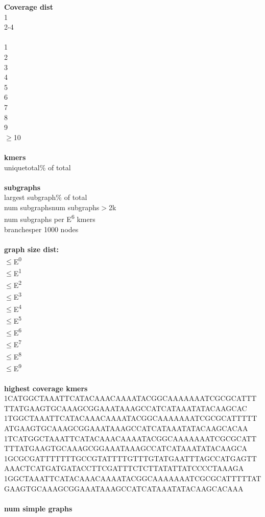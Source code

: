 \documentclass[a4paper, 12pt, oneside]{article}
\begin{document}
\textbf{Coverage dist}\\
1\\
2-4\\
\\
1\\
2\\
3\\
4\\
5\\
6\\
7\\
8\\
9\\
\(\geq\)10   \\
\\
\textbf{kmers}\\
unique\quad\quad total\quad\quad \% of total\\
\\
\textbf{subgraphs}\\
largest subgraph\quad\quad  \% of total\\
num subgraphs\quad num subgraphs\(>\)2k\\
num subgraphs per E\textsuperscript{6} kmers\\
branches\quad\quad per 1000 nodes\\
\\
\textbf{graph size dist:}\\
\(\leq\)E\textsuperscript{0}\\
\(\leq\)E\textsuperscript{1}\\
\(\leq\)E\textsuperscript{2}\\
\(\leq\)E\textsuperscript{3}\\
\(\leq\)E\textsuperscript{4}\\
\(\leq\)E\textsuperscript{5}\\
\(\leq\)E\textsuperscript{6}\\
\(\leq\)E\textsuperscript{7}\\
\(\leq\)E\textsuperscript{8}\\
\(\leq\)E\textsuperscript{9}\\
\\
\textbf{highest coverage kmers}\\
1\quad CATGGCTAAATTCATACAAACAAAATACGGCAAAAAAATCGCGCATTTTTATGAAGTGCAAAGCGGAAATAAAGCCATCATAAATATACAAGCAC\\
1\quad TGGCTAAATTCATACAAACAAAATACGGCAAAAAAATCGCGCATTTTTATGAAGTGCAAAGCGGAAATAAAGCCATCATAAATATACAAGCACAA\\
1\quad TCATGGCTAAATTCATACAAACAAAATACGGCAAAAAAATCGCGCATTTTTATGAAGTGCAAAGCGGAAATAAAGCCATCATAAATATACAAGCA\\
1\quad GCGCGATTTTTTTGCCGTATTTTGTTTGTATGAATTTAGCCATGAGTTAAACTCATGATGATACCTTCGATTTCTCTTATATTATCCCCTAAAGA\\
1\quad GGCTAAATTCATACAAACAAAATACGGCAAAAAAATCGCGCATTTTTATGAAGTGCAAAGCGGAAATAAAGCCATCATAAATATACAAGCACAAA\\
\\
\textbf{num simple graphs}\\
\end{document}
